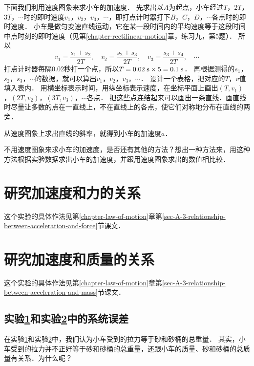 下面我们利用速度图象来求小车的加速度．
先求出以$A$为起点，小车经过$T $，$ 2T $，$ 3T $，$ \cdots$时的即时速度$v_1 $，$ v_2 $，$ v_3 $，$ \cdots$，即打点计时器打下$B $，$ C $，$ D $，$ \cdots$各点时的即时速度．
小车是做匀变速直线运动，它在某一段时间内的平均速度等于这段时间中点时刻的即时速度（见第\ref{chapter-rectilinear-motion}章，练习九，第5题）．
所以
\[v_1=\frac{s_1+s_2}{2T}, \quad  v_2=\frac{s_2+s_3}{2T},  \quad v_3=\frac{s_3+s_4}{2T},  \quad  \cdots\]
打点计时器每隔0.02秒打一个点，所以$T=0.02 \;\text{s} \times 5=0.1\;\text{s}$．
再根据测得的$s_1 $，$ s_2 $，$ s_3 $，$ \cdots$的数据，就可以算出$v_1 $，$ v_2 $，$ v_3 $，$ \cdots$．
设计一个表格，把对应的$T $，$ v$值填入表内．
用横坐标表示时间，用纵坐标表示速度，在坐标平面上画出$(T,v_1) $，$ (2T,v_2) $，$ (3T,v_3) $，$ \cdots$各点．
把这些点连结起来可以画出一条直线．画直线时尽量让多数的点在一直线上，不在直线上的各点，使它们对称地分布在直线的两旁．

从速度图象上求出直线的斜率，就得到小车的加速度$a$．

不用速度图象来求小车的加速度，是否还有其他的方法？想出一种方法来，用这种方法根据实验数据求出小车的加速度，并跟用速度图象求出的数值相比较．

\section{研究加速度和力的关系}\label{sec-A-app-1-8-studying-the-relationship-between-acceleration-and-force}
这个实验的具体作法见第\ref{chapter-law-of-motion}章第\ref{sec-A-3-relationship-between-acceleration-and-force}节课文．

\section{研究加速度和质量的关系}\label{sec-A-app-1-9-studying-the-relationship-between-acceleration-and-mass}
这个实验的具体作法见第\ref{chapter-law-of-motion}章第\ref{sec-A-3-relationship-between-acceleration-and-mass}节课文．

\subsection*{实验\ref{sec-A-app-1-8-studying-the-relationship-between-acceleration-and-force}和实验\ref{sec-A-app-1-9-studying-the-relationship-between-acceleration-and-mass}中的系统误差}
在实验\ref{sec-A-app-1-8-studying-the-relationship-between-acceleration-and-force}和实验\ref{sec-A-app-1-9-studying-the-relationship-between-acceleration-and-mass}中，我们认为小车受到的拉力等于砂和砂桶的总重量．
其实，小车受到的拉力并不正好等于砂和砂桶的总重量，还跟小车的质量、砂和砂桶的总质量有关系．为什么呢？

